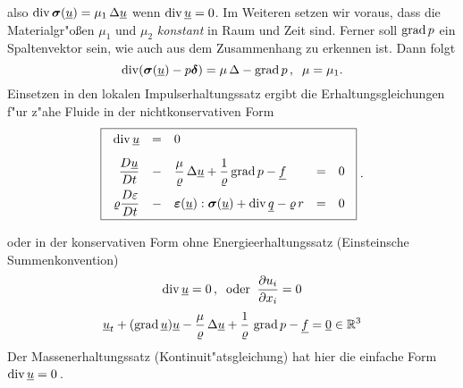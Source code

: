\documentclass[12pt,a4paper,leqno,twoside]{book}
\begin{document}
%
also $\div \sig(\u) = \mu_1\, \Delta \u$ wenn $\div \u = 0$.
Im Weiteren setzen wir voraus, dass die Materialgr"o\ss en $\mu _1$ und $\mu
_2$ {\em konstant} in Raum und Zeit sind.  Ferner soll $\grad p$ ein
Spaltenvektor sein, wie auch aus dem Zusammenhang zu erkennen ist.
Dann folgt
\[
\div(\sig (\u) - p\del)
=  \mu \,\Delta - \grad p\,,\;\; \mu = \mu_1.
\]
Einsetzen in den lokalen Impulserhaltungssatz ergibt die Erhaltungsgleichungen 
f"ur z"ahe Fluide in der nichtkonservativen Form  
%
\begin{equation} \label{e3}
\fbox{$\
 \ba{.}{rclcl}
\dis \: \div \u
&=& 0\\[2ex]
\dis \frac{D \u}{Dt} &-&\dis \frac{\mu}{\rho} \,\Delta \u
+ \frac{1}{\rho}\grad p - \f &=& 0\\[2ex]
\dis \rho \frac{D\epsilon }{Dt} &-& \eps(\u):\sig(\u) + \div \q
- \rho \,r &=& 0
\ea{.}
$}\; .
\end{equation}
\par
oder in der konservativen Form ohne Energieerhaltungssatz
({\sc Einstein}sche Summenkonvention)
\begin{equation} \label{e4}
\div \u = 0\,,\;\; \text{oder} \;\; \frac{\da u_i}{\da x_i} = 0
\end{equation}
%
\begin{equation}\label{e5}
\u_t + (\grad \u)\u - \frac{\mu}{\rho}\,\Delta \u 
+ \frac{1}{\rho}\, \grad p - \f = \ul{0} \in \mb{R}^3
\end{equation}
%
Der Massenerhaltungssatz (Kontinuit"atsgleichung) hat hier die einfache Form
$\div \u = 0$\,.
\par\vspace{0.5ex}
\end{document}
